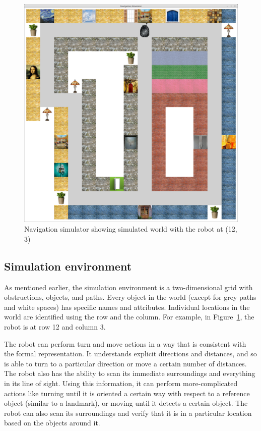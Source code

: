 \documentclass[11pt,letterpaper]{article}
\begin{document}
\begin{figure}[h]
\includegraphics[scale=0.15]{navsim.pdf}
\caption{Navigation simulator showing simulated world with the robot at (12, 3)}\label{fig:navsim}
\end{figure}

\subsection{Simulation environment}

As mentioned earlier, the simulation environment is a two-dimensional grid with obstructions, objects, and paths. Every object in the world (except for grey paths and white spaces) has specific names and attributes. Individual locations in the world are identified using the row and the column. For example, in Figure~\ref{fig:navsim}, the robot is at row 12 and column 3.

The robot can perform turn and move actions in a way that is consistent with the formal representation. It understands explicit directions and distances, and so is able to turn to a particular direction or move a certain number of distances. The robot also has the ability to scan its immediate surroundings and everything in its line of sight. Using this information, it can perform more-complicated actions like turning until it is oriented a certain way with respect to a reference object (similar to a landmark), or moving until it detects a certain object. The robot can also scan its surroundings and verify that it is in a particular location based on the objects around it.
\end{document}
